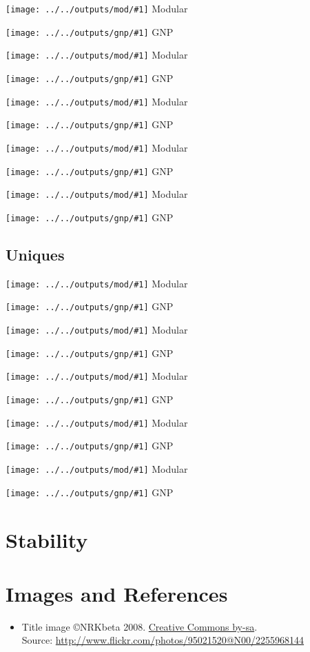 \documentclass[longdoc,nosectionpage,colorbacktitle,accentcolor=tud1b,11pt,paper=a4]{tudreport}
\newcounter{dummy} %
\newcommand{\imga}[2]{
  \texttt{[image: ../../outputs/mod/\#1]} Modular

  \texttt{[image: ../../outputs/gnp/\#1]} GNP

}
\begin{document}
	  \imga{loadBal_downBWConsPerHost_10000_300d}{.85}

	  \imga{loadBal_downBWPerHost_10000_300d}{.85}

	  \imga{loadBal_staleBWPerHost_10000_300d}{.85}

	  \imga{loadBal_upBWConsPerHost_10000_300d}{.85}

	  \imga{loadBal_upBWPerHost_10000_300d}{.85}

	  \subsection{Uniques}

	  \imga{loadBal_downBWConsPerHost_10000_voip}{.85}

	  \imga{loadBal_downBWPerHost_10000_voip}{.85}

 	  \imga{loadBal_staleBWPerHost_10000_voip}{.85}

	  \imga{loadBal_upBWConsPerHost_10000_voip}{.85}

	  \imga{loadBal_upBWPerHost_10000_voip}{.85}

	\section{Stability}

	\section{Images and References}
	\begin{itemize}
	 \item Title image \copyright NRKbeta 2008. \href{http://creativecommons.org/licenses/by-sa/2.0/deed.de}{Creative Commons by-sa}. \\ Source: \href{http://www.flickr.com/photos/95021520@N00/2255968144}{http://www.flickr.com/photos/95021520@N00/2255968144}
	\end{itemize}

	
\end{document}
